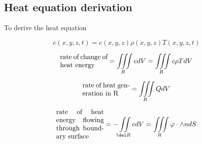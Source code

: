 \begin{appendices}
\chapter{Heat equation derivation}

To derive the heat equation


\begin{equation}
e(x,y,z,t)=c(x,y,z)\rho(x,y,z) T(x,y,z,t)
\end{equation} 

\begin{equation}
\parbox{70pt}{rate of change of heat energy} = \iiint\limits_{R} edV= \iiint\limits_{R} c\rho TdV
\end{equation}


\begin{equation}
\parbox{70pt}{rate of heat generation in R} = \iiint\limits_{R} Q dV
\end{equation}

\begin{equation}
\parbox{70pt}{rate of heat energy flowing through boundary surface} = -\iint\limits_{\del R} edV= \iiint\limits_{R} \varphi\cdot \wedge{n} dS
\end{equation}

\end{appendices}